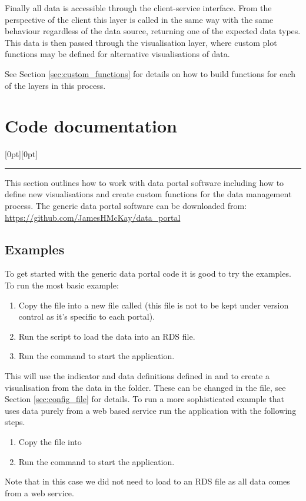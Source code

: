 \documentclass[12pt]{article}
\newcommand\statssection[1]{%
  \section{{#1}}
  \raisebox{1.5em}[0pt][0pt]{\textcolor{statsorange}{\rule{0.2\textwidth}{6pt}}}
}
\begin{document}
Finally all data is accessible through the client-service interface.  From the perspective of the client this layer is called in the same way with the same behaviour regardless of the data source, returning one of the expected data types.  This data is then passed through the visualisation layer, where custom plot functions may be defined for alternative visualisations of data.

See Section \ref{sec:custom_functions} for details on how to build functions for each of the layers in this process.

\newpage
\clearpage
\statssection{Code documentation}

This section outlines how to work with data portal software including how to define new visualisations and create custom functions for the data management process.  The generic data portal software can be downloaded from:\\

\noindent
\url{https://github.com/JamesHMcKay/data_portal}

\subsection{Examples}

To get started with the generic data portal code it is good to try the examples.  To run the most basic example:
\begin{enumerate}
\item Copy the file  into a new file called  (this file is not to be kept under version control as it's specific to each portal).
\item Run the script  to load the data into an RDS file.
\item Run the command  to start the application.
\end{enumerate}

This will use the indicator and data definitions defined in  and  to create a visualisation from the data in the  folder.  These can be changed in the  file, see Section \ref{sec:config_file} for details.  To run a more sophisticated example that uses data purely from a web based service run the application with the following steps.
\begin{enumerate}
\item Copy the file  into 
\item Run the command  to start the application.
\end{enumerate}
Note that in this case we did not need to load to an RDS file as all data comes from a web service.
\end{document}
